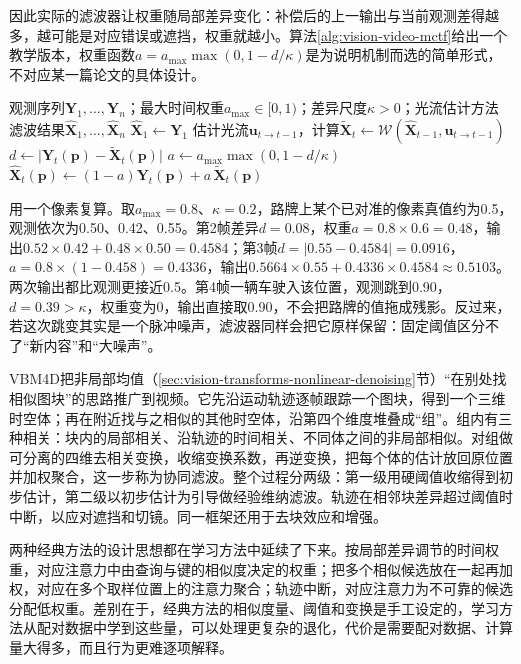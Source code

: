 因此实际的滤波器让权重随局部差异变化：补偿后的上一输出与当前观测差得越多，越可能是对应错误或遮挡，权重就越小。算法\ref{alg:vision-video-mctf}给出一个教学版本，权重函数$a=a_{\max}\max(0,1-d/\kappa)$是为说明机制而选的简单形式，不对应某一篇论文的具体设计。

\begin{algorithm}
  \label{alg:vision-video-mctf}
  \begin{algorithmic}[1]
    \Require 观测序列$\bm{Y}_1,\dots,\bm{Y}_n$；最大时间权重$a_{\max}\in[0,1)$；差异尺度$\kappa>0$；光流估计方法
    \Ensure 滤波结果$\widehat{\bm{X}}_1,\dots,\widehat{\bm{X}}_n$
    \State $\widehat{\bm{X}}_1\gets\bm{Y}_1$
      \State 估计光流$\bm{u}_{t\to t-1}$，计算$\widetilde{\bm{X}}_t\gets\mathcal{W}(\widehat{\bm{X}}_{t-1},\bm{u}_{t\to t-1})$
        \State $d\gets\lvert\bm{Y}_t(\bm{p})-\widetilde{\bm{X}}_t(\bm{p})\rvert$
        \State $a\gets a_{\max}\max(0,1-d/\kappa)$
        \State $\widehat{\bm{X}}_t(\bm{p})\gets(1-a)\bm{Y}_t(\bm{p})+a\,\widetilde{\bm{X}}_t(\bm{p})$
      \EndFor
    \EndFor
  \end{algorithmic}
\end{algorithm}

用一个像素复算。取$a_{\max}=0.8$、$\kappa=0.2$，路牌上某个已对准的像素真值约为0.5，观测依次为0.50、0.42、0.55。第2帧差异$d=0.08$，权重$a=0.8\times0.6=0.48$，输出$0.52\times0.42+0.48\times0.50=0.4584$；第3帧$d=|0.55-0.4584|=0.0916$，$a=0.8\times(1-0.458)=0.4336$，输出$0.5664\times0.55+0.4336\times0.4584\approx0.5103$。两次输出都比观测更接近0.5。第4帧一辆车驶入该位置，观测跳到0.90，$d=0.39>\kappa$，权重变为0，输出直接取0.90，不会把路牌的值拖成残影。反过来，若这次跳变其实是一个脉冲噪声，滤波器同样会把它原样保留：固定阈值区分不了“新内容”和“大噪声”。

VBM4D把非局部均值（\ref{sec:vision-transforms-nonlinear-denoising}节）“在别处找相似图块”的思路推广到视频。它先沿运动轨迹逐帧跟踪一个图块，得到一个三维时空体；再在附近找与之相似的其他时空体，沿第四个维度堆叠成“组”。组内有三种相关：块内的局部相关、沿轨迹的时间相关、不同体之间的非局部相似。对组做可分离的四维去相关变换，收缩变换系数，再逆变换，把每个体的估计放回原位置并加权聚合，这一步称为协同滤波。整个过程分两级：第一级用硬阈值收缩得到初步估计，第二级以初步估计为引导做经验维纳滤波。轨迹在相邻块差异超过阈值时中断，以应对遮挡和切镜。同一框架还用于去块效应和增强。

两种经典方法的设计思想都在学习方法中延续了下来。按局部差异调节的时间权重，对应注意力中由查询与键的相似度决定的权重；把多个相似候选放在一起再加权，对应在多个取样位置上的注意力聚合；轨迹中断，对应注意力为不可靠的候选分配低权重。差别在于，经典方法的相似度量、阈值和变换是手工设定的，学习方法从配对数据中学到这些量，可以处理更复杂的退化，代价是需要配对数据、计算量大得多，而且行为更难逐项解释。

